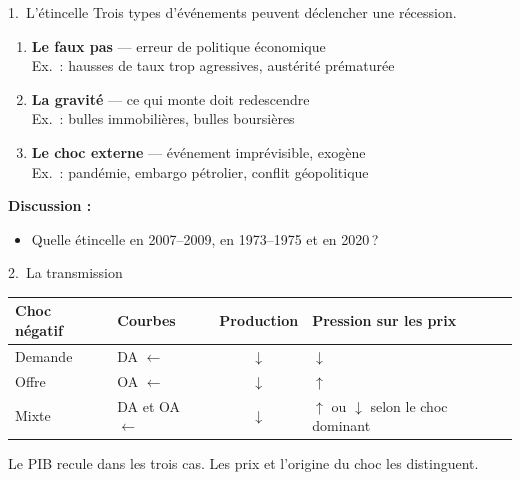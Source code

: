 \documentclass[aspectratio=169]{beamer}
\begin{document}
\begin{frame}[t]{1.\ L’étincelle}
   \small
   Trois types d’événements peuvent déclencher une récession.
   \vspace{0.25cm}
   \begin{enumerate}
      \setlength\itemsep{0.25cm}
      \item[\textcolor{HECnavy}{\textbf{A.}}] \textbf{Le faux pas} --- erreur de politique économique\\
         {\footnotesize\textcolor{HECgray}{Ex.\ : hausses de taux trop agressives, austérité prématurée}}
      \item[\textcolor{HECnavy}{\textbf{B.}}] \textbf{La gravité} --- ce qui monte doit redescendre\\
         {\footnotesize\textcolor{HECgray}{Ex.\ : bulles immobilières, bulles boursières}}
      \item[\textcolor{HECnavy}{\textbf{C.}}] \textbf{Le choc externe} --- événement imprévisible, exogène\\
         {\footnotesize\textcolor{HECgray}{Ex.\ : pandémie, embargo pétrolier, conflit géopolitique}}
   \end{enumerate}
   \vspace{0.3cm}
   \textbf{\textcolor{HECnavy}{Discussion :}}
   \vspace{0.1cm}
   \begin{itemize}
      \setlength\itemsep{0.1cm}
      \item Quelle étincelle en 2007–2009, en 1973–1975 et en 2020\,?
   \end{itemize}
\end{frame}

\begin{frame}{2.\ La transmission}\examtag
   \small
   \renewcommand{\arraystretch}{1.65}
   \begin{tabularx}{\textwidth}{l l c >{\raggedright\arraybackslash}X}
      \toprule
      \textbf{Choc négatif} & \textbf{Courbes} & \textbf{Production} & \textbf{Pression sur les prix} \\
      \midrule
      Demande & DA $\leftarrow$ & $\downarrow$ & $\downarrow$ \\
      Offre & OA $\leftarrow$ & $\downarrow$ & $\uparrow$ \\
      Mixte & DA et OA $\leftarrow$ & $\downarrow$ & $\uparrow$ ou $\downarrow$ selon le choc dominant \\
      \bottomrule
   \end{tabularx}
   \vspace{0.3cm}
   \begin{keyinsight}[Le diagnostic]
      Le PIB recule dans les trois cas. Les prix et l’origine du choc les distinguent.
   \end{keyinsight}
\end{frame}
\end{document}

